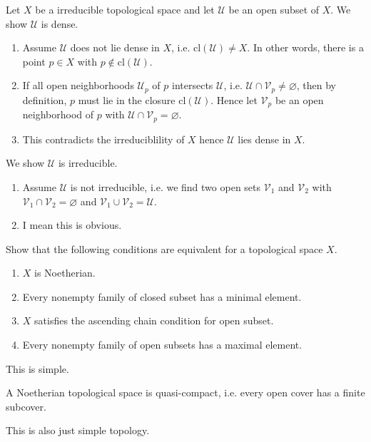 \begin{solution}
    Let \(X\) be a irreducible topological space and let \(\mathcal{U}\) be an open subset of \(X\). We show \(\mathcal{U}\) is dense.
    \begin{enumerate}
        \item Assume \(\mathcal{U}\) does not lie dense in \(X\), i.e. \(\text{cl}(\mathcal{U}) \neq X\). In other words, there is a point \(p \in X\) with \(p \not\in \text{cl}(\mathcal{U})\).
        \item If all open neighborhoods \(\mathcal{U}_p\) of \(p\) intersects \(\mathcal{U}\), i.e. \(\mathcal{U} \cap \mathcal{V}_p \neq \varnothing\), then by definition, \(p\) must lie in the closure \(\text{cl}(\mathcal{U})\). Hence let \(\mathcal{V}_p\) be an open neighborhood of \(p\) with \(\mathcal{U} \cap \mathcal{V}_p = \varnothing\).
        \item This contradicts the irreduciblility of \(X\) hence \(\mathcal{U}\) lies dense in \(X\).
    \end{enumerate}
    We show \(\mathcal{U}\) is irreducible.
    \begin{enumerate}
        \item Assume \(\mathcal{U}\) is not irreducible, i.e. we find two open sets \(\mathcal{V}_1\) and \(\mathcal{V}_2\) with \(\mathcal{V}_1 \cap \mathcal{V}_2 = \varnothing\) and \(\mathcal{V}_1 \cup \mathcal{V}_2 = \mathcal{U}\).
        \item I mean this is obvious.
    \end{enumerate}
\end{solution}
%
%
%
\begin{exercise}[1.7.]
    Show that the following conditions are equivalent for a topological space \(X\).
    \begin{enumerate}
        \item \(X\) is Noetherian.
        \item Every nonempty family of closed subset has a minimal element.
        \item \(X\) satisfies the ascending chain condition for open subset.
        \item Every nonempty family of open subsets has a maximal element.
    \end{enumerate}
\end{exercise}
\begin{solution}
    This is simple.
\end{solution}
\begin{exercise}[1.7. (b)]
    A Noetherian topological space is quasi-compact, i.e. every open cover has a finite subcover.
\end{exercise}
\begin{solution}
    This is also just simple topology.
\end{solution}

